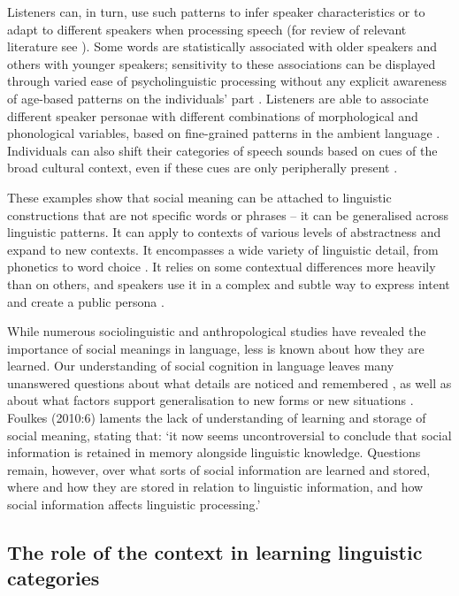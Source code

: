 \documentclass{frontiersSCNS} %
\begin{document}
Listeners can, in turn, use such patterns to infer speaker characteristics or to adapt to different speakers when processing speech (for review of relevant literature see \cite{hay2007sociophonetics,foulkes2015}).   Some words are statistically associated with older speakers and others with younger speakers; sensitivity to these associations can be displayed through varied ease of psycholinguistic processing without any explicit awareness of age-based patterns on the individuals' part \citep{walker2011}. Listeners are able to associate different speaker personae with different combinations of morphological and phonological variables, based on fine-grained patterns in the ambient language \citep{campbell2011}. Individuals can also shift their categories of speech sounds based on cues of the broad cultural context, even if these cues are only peripherally present \citep{hay2010stuffed}. 

These examples show that social meaning can be attached to linguistic constructions that are not specific words or phrases -- it can be generalised across linguistic patterns. It can apply to contexts of various levels of abstractness and expand to new contexts. It encompasses a wide variety of linguistic detail, from phonetics to word choice \citep{german2013,saily_comparing_2009}. It relies on some contextual differences more heavily than on others, and speakers use it in a complex and subtle way to express intent and create a public persona  \citep{eckert2012three}.

While numerous sociolinguistic and anthropological studies have revealed the importance of social meanings in language, less is known about how they are learned. Our understanding of social cognition in language leaves many unanswered questions
about what details are noticed and remembered \citep{silverstein2001}, as well as about what factors support generalisation to new forms or new situations \citep{pierrehumbert2006b}. \nocite{foulkes2010exploring} Foulkes (2010:6) laments the lack of understanding of learning and storage of social meaning, stating that: `it now seems uncontroversial to conclude that social information is retained in memory alongside linguistic knowledge. Questions remain, however, over what sorts of social information are learned and stored, where and how they  are stored in relation to linguistic information, and how social information affects linguistic processing.'

\subsection{The role of the context in learning linguistic categories}
\end{document}
